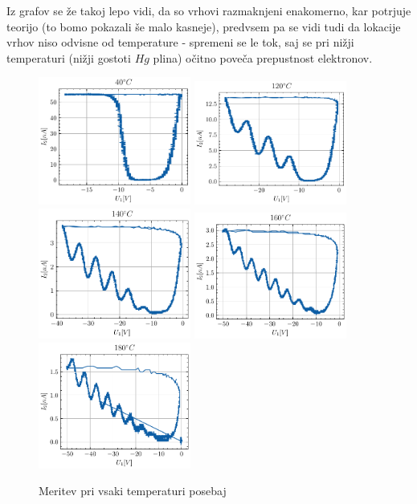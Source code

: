 \documentclass[10pt]{article}
\begin{document}
Iz grafov se že takoj lepo vidi, da so vrhovi razmaknjeni enakomerno, kar potrjuje teorijo (to bomo pokazali še malo kasneje), predvsem pa se vidi tudi da lokacije vrhov niso odvisne od temperature - spremeni se le tok, saj se pri nižji temperaturi (nižji gostoti $Hg$ plina) očitno poveča prepustnost elektronov.
\newpage
\begin{figure}[h]
    \begin{center}
        \includegraphics[width=5cm]{40.pdf}
        \includegraphics[width=5cm]{120.pdf}
        \includegraphics[width=5cm]{140.pdf}
        \includegraphics[width=5cm]{160.pdf}
        \includegraphics[width=5cm]{180.pdf}
        \caption{Meritev pri vsaki temperaturi posebaj}
        \label{posebej}
    \end{center}
\end{figure}
\end{document}
